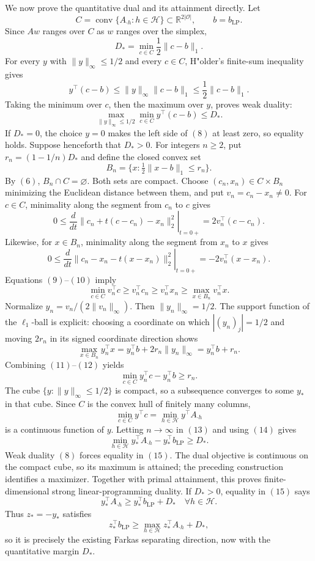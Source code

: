 We now prove the quantitative dual and its attainment directly. Let
\[
C=\operatorname{conv}\{A_{\cdot h}:h\in\mathcal H\}\subset\mathbb R^{2|\mathcal O|},\qquad b=b_{\mathrm{LP}}.
\]
Since \(Aw\) ranges over \(C\) as \(w\) ranges over the simplex,
\[
D_*=\min_{c\in C}\frac12\lVert c-b\rVert_1.
\tag{6}
\]
For every \(y\) with \(\lVert y\rVert_\infty\le1/2\) and every \(c\in C\), H"older's finite-sum inequality gives
\[
y^\top(c-b)\le\lVert y\rVert_\infty\lVert c-b\rVert_1\le\frac12\lVert c-b\rVert_1.
\tag{7}
\]
Taking the minimum over \(c\), then the maximum over \(y\), proves weak duality:
\[
\max_{\lVert y\rVert_\infty\le1/2}\min_{c\in C}y^\top(c-b)\le D_*.
\tag{8}
\]
If \(D_*=0\), the choice \(y=0\) makes the left side of \((8)\) at least zero, so equality holds. Suppose henceforth that \(D_*>0\). For integers \(n\ge2\), put \(r_n=(1-1/n)D_*\) and define the closed convex set
\[
B_n=\{x:\tfrac12\lVert x-b\rVert_1\le r_n\}.
\]
By \((6)\), \(B_n\cap C=\varnothing\). Both sets are compact. Choose \((c_n,x_n)\in C\times B_n\) minimizing the Euclidean distance between them, and put \(v_n=c_n-x_n\ne0\). For \(c\in C\), minimality along the segment from \(c_n\) to \(c\) gives
\[
0\le\left.\frac{d}{dt}\lVert c_n+t(c-c_n)-x_n\rVert_2^2\right|_{t=0+}=2v_n^\top(c-c_n).
\tag{9}
\]
Likewise, for \(x\in B_n\), minimality along the segment from \(x_n\) to \(x\) gives
\[
0\le\left.\frac{d}{dt}\lVert c_n-x_n-t(x-x_n)\rVert_2^2\right|_{t=0+}=-2v_n^\top(x-x_n).
\tag{10}
\]
Equations \((9)\)--\((10)\) imply
\[
\min_{c\in C}v_n^\top c\ge v_n^\top c_n\ge v_n^\top x_n\ge\max_{x\in B_n}v_n^\top x.
\tag{11}
\]
Normalize \(y_n=v_n/(2\lVert v_n\rVert_\infty)\). Then \(\lVert y_n\rVert_\infty=1/2\). The support function of the \(\ell_1\)-ball is explicit: choosing a coordinate on which \(|(y_n)_j|=1/2\) and moving \(2r_n\) in its signed coordinate direction shows
\[
\max_{x\in B_n}y_n^\top x=y_n^\top b+2r_n\lVert y_n\rVert_\infty=y_n^\top b+r_n.
\tag{12}
\]
Combining \((11)\)--\((12)\) yields
\[
\min_{c\in C}y_n^\top c-y_n^\top b\ge r_n.
\tag{13}
\]
The cube \(\{y:\lVert y\rVert_\infty\le1/2\}\) is compact, so a subsequence converges to some \(y_*\) in that cube. Since \(C\) is the convex hull of finitely many columns,
\[
\min_{c\in C}y^\top c=\min_{h\in\mathcal H}y^\top A_{\cdot h}
\tag{14}
\]
is a continuous function of \(y\). Letting \(n\to\infty\) in \((13)\) and using \((14)\) gives
\[
\min_{h\in\mathcal H}y_*^\top A_{\cdot h}-y_*^\top b_{\mathrm{LP}}\ge D_*.
\tag{15}
\]
Weak duality \((8)\) forces equality in \((15)\). The dual objective is continuous on the compact cube, so its maximum is attained; the preceding construction identifies a maximizer. Together with primal attainment, this proves finite-dimensional strong linear-programming duality. If \(D_*>0\), equality in \((15)\) says
\[
y_*^\top A_{\cdot h}\ge y_*^\top b_{\mathrm{LP}}+D_*\quad\forall h\in\mathcal H.
\tag{16}
\]
Thus \(z_*=-y_*\) satisfies
\[
z_*^\top b_{\mathrm{LP}}\ge\max_{h\in\mathcal H}z_*^\top A_{\cdot h}+D_*,
\tag{17}
\]
so it is precisely the existing Farkas separating direction, now with the quantitative margin \(D_*\).

